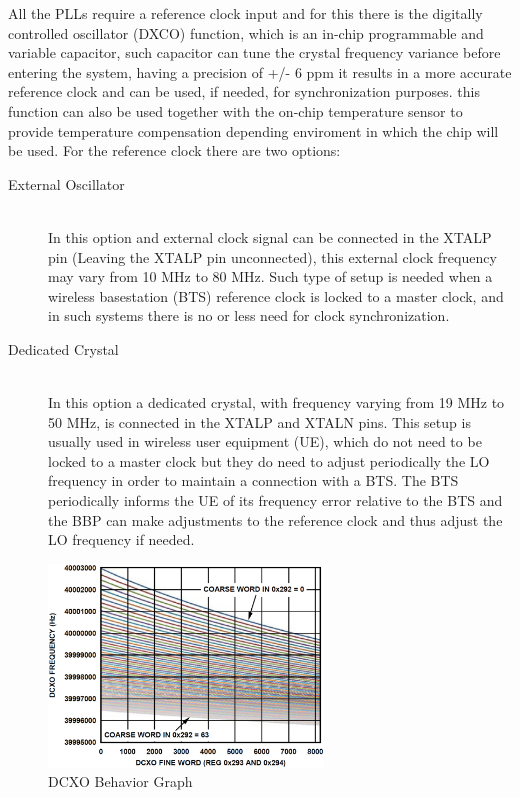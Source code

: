 All the PLLs require a reference clock input and for this there is the digitally controlled oscillator (DXCO) function, which is an in-chip programmable and variable capacitor, such capacitor can tune the crystal frequency variance before entering the system, having a precision of +/- 6 ppm it results in a more accurate reference clock and can be used, if needed, for synchronization purposes. this function can also be used together with the on-chip temperature sensor to provide temperature compensation depending enviroment in which the chip will be used. For the reference clock there are two options:

\begin{description}
	\item[External Oscillator] \hfill \\
	In this option and external clock signal can be connected in the XTALP pin (Leaving the XTALP pin unconnected), this external clock frequency may vary from 10 MHz to 80 MHz. Such type of setup is needed when a wireless basestation (BTS) reference clock is locked to a master clock, and in such systems there is no or less need for clock synchronization.

	\item[Dedicated Crystal] \hfill \\
	In this option a dedicated crystal, with frequency varying from 19 MHz to 50 MHz, is connected in the XTALP and XTALN pins. This setup is usually used in wireless user equipment (UE), which do not need to be locked to a master clock but they do need to adjust periodically the LO frequency in order to maintain a connection with a BTS. The BTS periodically informs the UE of its frequency error relative to the BTS and the BBP can make adjustments to the reference clock and thus adjust the LO frequency if needed.

\end{description}

\begin{figure}[htbp]
    \centering
    \includegraphics[width=0.65\textwidth]{./figures/dcxo_graph}
    \caption{ DCXO Behavior Graph
    \label{fig:pll}}
\end{figure}

